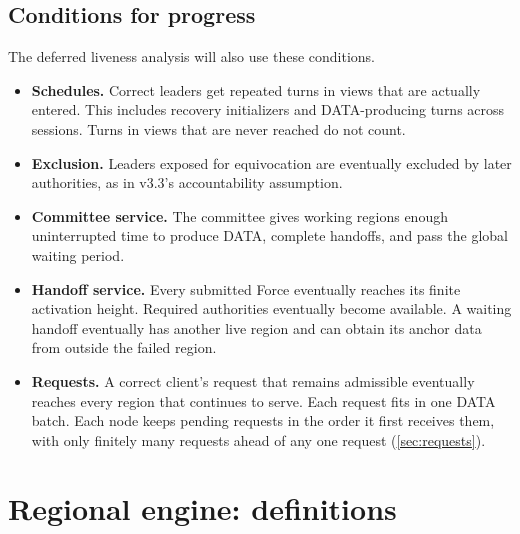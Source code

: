 \documentclass[11pt,a4paper]{article}
\begin{document}
\subsection{Conditions for progress}
\label{sec:progress}
The deferred liveness analysis will also use these conditions.
\begin{itemize}
\item \textbf{Schedules.} Correct leaders get repeated turns in views
that are actually entered. This includes recovery initializers and
DATA-producing turns across sessions. Turns in views that are never
reached do not count.
\item \textbf{Exclusion.} Leaders exposed for equivocation are eventually
excluded by later authorities, as in v3.3's accountability assumption.
\item \textbf{Committee service.} The committee gives working regions
enough uninterrupted time to produce DATA, complete handoffs, and pass
the global waiting period.
\item \textbf{Handoff service.} Every submitted Force eventually reaches
its finite activation height. Required authorities eventually become
available. A waiting handoff eventually has another live region and
can obtain its anchor data from outside the failed region.
\item \textbf{Requests.} A correct client's request that remains
admissible eventually reaches every region that continues to serve.
Each request fits in one DATA batch. Each node keeps pending requests
in the order it first receives them, with only finitely many requests
ahead of any one request (\cref{sec:requests}).
\end{itemize}

\section{Regional engine: definitions}
\label{sec:regional}
\end{document}
